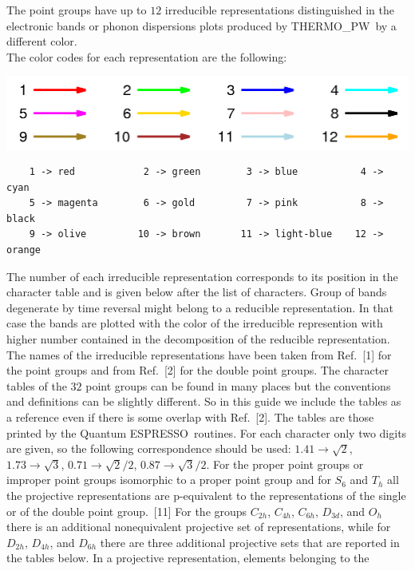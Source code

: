 \documentclass[12pt,a4paper]{article}
\def\qe{{\sc Quantum ESPRESSO}}
\def\tpw{{\sc THERMO\_PW}}
\begin{document}
The point groups have up to $12$ irreducible 
representations distinguished in the electronic bands or phonon dispersions
plots produced by \tpw\ by a different color. \\
The color codes for each representation are the following:
\begin{center}
\includegraphics[width=16cm]{color.png} 
\end{center}
\begin{verbatim}
    1 -> red            2 -> green        3 -> blue           4 -> cyan
    5 -> magenta        6 -> gold         7 -> pink           8 -> black
    9 -> olive         10 -> brown       11 -> light-blue    12 -> orange
\end{verbatim} 
The number of each irreducible representation corresponds to its position
in the character table and is given below after the list of characters. 
Group of bands degenerate by time reversal might belong to a reducible
representation. In that case the bands are plotted with the color of the
irreducible represention with higher number contained in the decomposition
of the reducible representation.
The names of the irreducible representations have been taken from Ref.~[1]
for the point groups and from Ref.~[2] for the double point groups. 
The character tables of the $32$ point groups can be found in many places 
but the conventions and definitions can be slightly different. So in
this guide we include the tables as a reference even if there is some 
overlap with Ref.~[2]. The tables are those printed by the \qe\ 
routines. For each character only two digits are given, so the
following correspondence should be used:
$1.41 \rightarrow \sqrt{2}$, $1.73 \rightarrow \sqrt{3}$, 
$0.71 \rightarrow \sqrt{2}/2$, $0.87 \rightarrow \sqrt{3}/2$.
For the proper point groups or improper point groups isomorphic to a 
proper point group and for $S_6$ and $T_h$ all the projective 
representations are p-equivalent to the representations of the single 
or of the double point group.~[11] For the groups $C_{2h}$, $C_{4h}$, $C_{6h}$,
$D_{3d}$, and $O_h$ there is an additional nonequivalent projective 
set of representations, while for $D_{2h}$, $D_{4h}$, and $D_{6h}$ there 
are three additional projective sets that are reported in the tables below.
In a projective representation, elements belonging to the 
\end{document}
